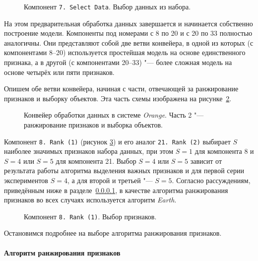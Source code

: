 \begin{figure}[tbp]
    \caption{Компонент \texttt{7.\,Select~Data}. Выбор данных из набора.}
    \label{img:7-Select-Data}
\end{figure}

На этом предварительная обработка данных завершается и начинается собственно построение модели. Компоненты под номерами с 8 по 20 и с 20 по 33 полностью аналогичны. Они представляют собой две ветви конвейера, в одной из которых (с компонентами 8--20) используется простейшая модель на основе единственного признака, а в другой (с компонентами 20--33) "--- более сложная модель на основе четырёх или пяти признаков.

Опишем обе ветви конвейера, начиная с части, отвечающей за ранжирование признаков и выборку объектов. Эта часть схемы изображена на рисунке~\ref{img:series30-2}.

\begin{figure}[tbp]
    \caption{Конвейер обработки данных в системе \textit{Orange}. Часть 2 "--- ранжирование признаков и выборка объектов.}
    \label{img:series30-2}
\end{figure}

Компонент \texttt{8.\,Rank~(1)} (рисунок \ref{img:8-Rank-1}) и его аналог \texttt{21.\,Rank~(2)}  выбирает $S$ наиболее значимых признаков набора данных, при этом $S = 1$ для компонента 8 и $S = 4$ или $S = 5$ для компонента 21. Выбор $S = 4$ или $S = 5$ зависит от результата работы алгоритма выделения важных признаков и для первой серии экспериментов $S = 4$, а для второй и третьей "--- $S = 5$. Согласно рассуждениям, приведённым ниже в разделе~\ref{choice-of-feature-ranking-algorithm}, в качестве алгоритма ранжирования признаков во всех случаях используется алгоритм \textit{Earth}.

\begin{figure}[tbp]
    \caption{Компонент \texttt{8.\,Rank~(1)}. Выбор признаков.}
    \label{img:8-Rank-1}
\end{figure}

Остановимся подробнее на выборе алгоритма ранжирования признаков.

\paragraph{Алгоритм ранжирования признаков}
\label{choice-of-feature-ranking-algorithm}

